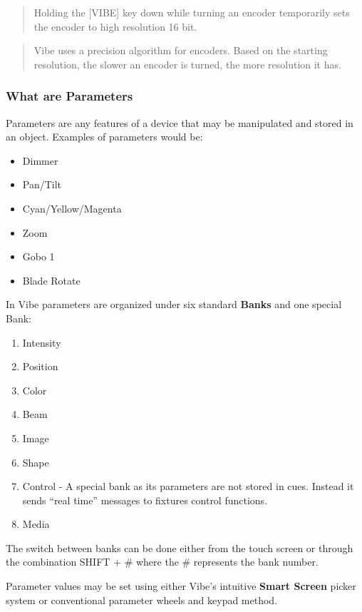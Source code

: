 \documentclass[
]{article}
\begin{document}
\begin{quote}
Holding the {[}VIBE{]} key down while turning an encoder temporarily sets the encoder to high resolution 16 bit.
\end{quote}

\begin{quote}
Vibe uses a precision algorithm for encoders. Based on the starting resolution, the slower an encoder is turned, the more resolution it has.
\end{quote}

\hypertarget{what-are-parameters}{%
\subsubsection{What are Parameters}\label{what-are-parameters}}

Parameters are any features of a device that may be manipulated and stored in an object. Examples of parameters would be:

\begin{itemize}
\item
  Dimmer
\item
  Pan/Tilt
\item
  Cyan/Yellow/Magenta
\item
  Zoom
\item
  Gobo 1
\item
  Blade Rotate
\end{itemize}

In Vibe parameters are organized under six standard \textbf{Banks} and one special Bank:

\begin{enumerate}
\def\labelenumi{\arabic{enumi}.}
\item
  Intensity
\item
  Position
\item
  Color
\item
  Beam
\item
  Image
\item
  Shape
\item
  Control - A special bank as its parameters are not stored in cues.
  Instead it sends ``real time'' messages to fixtures control functions.
\item
  Media
\end{enumerate}

The switch between banks can be done either from the touch screen or through the combination SHIFT + \# where the \# represents the bank number.

Parameter values may be set using either Vibe's intuitive \textbf{Smart Screen} picker system or conventional parameter wheels and keypad method.
\end{document}
